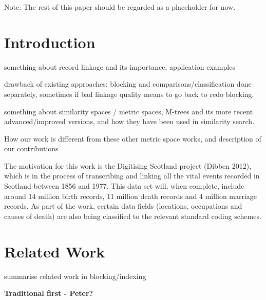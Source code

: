 \documentclass{llncs}
\begin{document}
Note: The rest of this paper should be regarded as a placeholder for now.


\section{Introduction}
\label{sec-intro}

something about record linkage and its importance, application examples


drawback of existing approaches: blocking and comparisons/classification
done separately, sometimes if bad linkage quality means to go back to redo
blocking.

something about similarity spaces / metric spaces, M-trees and its
more recent advanced/improved versions, and how they have been used in
similarity search.

How our work is different from these other metric space works, and
description of our contributions

The motivation for this work is the Digitising Scotland project (Dibben 2012), which is in the process of transcribing and linking all the vital events recorded in Scotland between 1856 and 1977. This data set will, when complete, include around 14 million birth records, 11 million death records and 4 million marriage records. As part of the work, certain data fields (locations, occupations and causes of death) are also being classified to the relevant standard coding schemes.



\section{Related Work}
\label{sec-related}

summarise related work in blocking/indexing

\textbf{Traditional first - Peter?}
\end{document}
